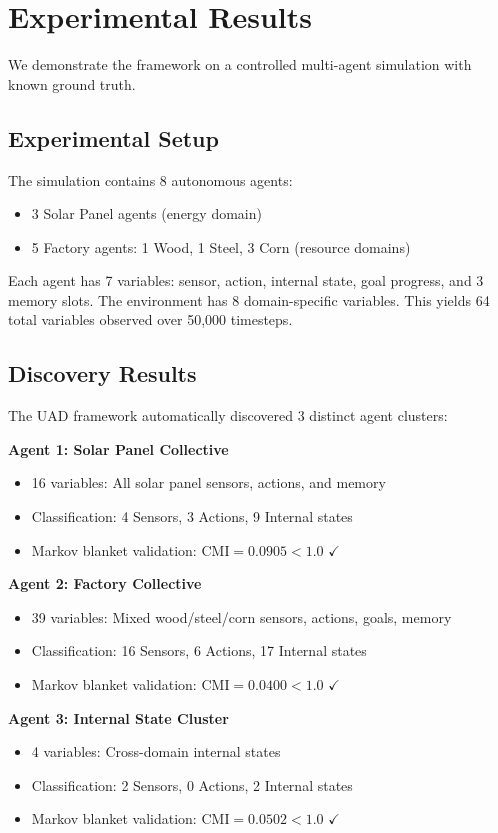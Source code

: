 \documentclass[10pt,conference]{IEEEtran}
\begin{document}
\section{Experimental Results}
We demonstrate the framework on a controlled multi-agent simulation with known ground truth.

\subsection{Experimental Setup}
The simulation contains 8 autonomous agents:
\begin{itemize}
  \item 3 Solar Panel agents (energy domain)
  \item 5 Factory agents: 1 Wood, 1 Steel, 3 Corn (resource domains)
\end{itemize}

Each agent has 7 variables: sensor, action, internal state, goal progress, and 3 memory slots. The environment has 8 domain-specific variables. This yields 64 total variables observed over 50,000 timesteps.

\subsection{Discovery Results}
The UAD framework automatically discovered 3 distinct agent clusters:

\textbf{Agent 1: Solar Panel Collective}
\begin{itemize}
  \item 16 variables: All solar panel sensors, actions, and memory
  \item Classification: 4 Sensors, 3 Actions, 9 Internal states
  \item Markov blanket validation: $\mathrm{CMI}=0.0905 < 1.0$ $\checkmark$
\end{itemize}

\textbf{Agent 2: Factory Collective}
\begin{itemize}
  \item 39 variables: Mixed wood/steel/corn sensors, actions, goals, memory
  \item Classification: 16 Sensors, 6 Actions, 17 Internal states
  \item Markov blanket validation: $\mathrm{CMI}=0.0400 < 1.0$ $\checkmark$
\end{itemize}

\textbf{Agent 3: Internal State Cluster}
\begin{itemize}
  \item 4 variables: Cross-domain internal states
  \item Classification: 2 Sensors, 0 Actions, 2 Internal states
  \item Markov blanket validation: $\mathrm{CMI}=0.0502 < 1.0$ $\checkmark$
\end{itemize}
\end{document}
